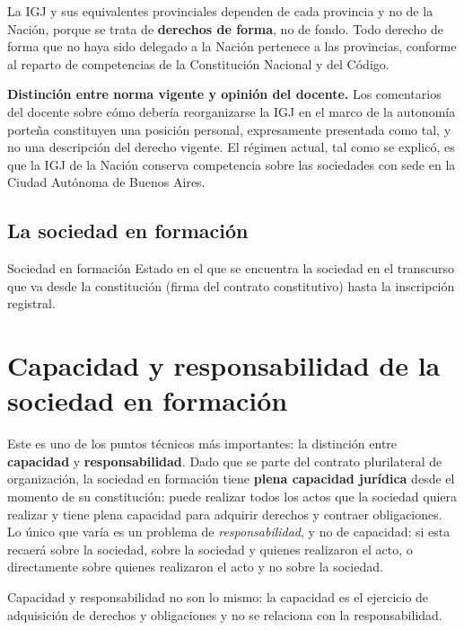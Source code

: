 \documentclass[12pt,oneside]{book}
\begin{document}
La IGJ y sus equivalentes provinciales dependen de cada provincia y no de la Nación, porque se trata de \textbf{derechos de forma}, no de fondo. Todo derecho de forma que no haya sido delegado a la Nación pertenece a las provincias, conforme al reparto de competencias de la Constitución Nacional y del Código.

\begin{note}
\textbf{Distinción entre norma vigente y opinión del docente.} Los comentarios del docente sobre cómo debería reorganizarse la IGJ en el marco de la autonomía porteña constituyen una posición personal, expresamente presentada como tal, y no una descripción del derecho vigente. El régimen actual, tal como se explicó, es que la IGJ de la Nación conserva competencia sobre las sociedades con sede en la Ciudad Autónoma de Buenos Aires.
\end{note}

\subsection{La sociedad en formación}

\begin{definition}{Sociedad en formación}
Estado en el que se encuentra la sociedad en el transcurso que va desde la constitución (firma del contrato constitutivo) hasta la inscripción registral.
\end{definition}

\section{Capacidad y responsabilidad de la sociedad en formación}
\label{sec:capacidad}

Este es uno de los puntos técnicos más importantes: la distinción entre \textbf{capacidad} y \textbf{responsabilidad}. Dado que se parte del contrato plurilateral de organización, la sociedad en formación tiene \textbf{plena capacidad jurídica} desde el momento de su constitución: puede realizar todos los actos que la sociedad quiera realizar y tiene plena capacidad para adquirir derechos y contraer obligaciones. Lo único que varía es un problema de \emph{responsabilidad}, y no de capacidad: si esta recaerá sobre la sociedad, sobre la sociedad y quienes realizaron el acto, o directamente sobre quienes realizaron el acto y no sobre la sociedad.

Capacidad y responsabilidad no son lo mismo: la capacidad es el ejercicio de adquisición de derechos y obligaciones y no se relaciona con la responsabilidad.
\end{document}
